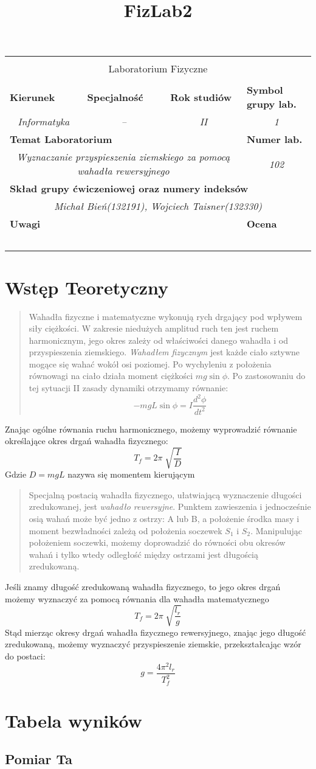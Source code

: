 \documentclass[polish,a4paper]{article}
\title{FizLab2}
\newcommand{\PRzFieldDsc}[1]{\sffamily\bfseries\scriptsize #1}
\newcommand{\PRzFieldCnt}[1]{\textit{#1}}
\newcommand{\PRzHeading}[8]{
\begin{center}
\begin{tabular}{ p{0.32\textwidth} p{0.15\textwidth} p{0.15\textwidth} p{0.12\textwidth} p{0.12\textwidth} }

  &   &   &   &   \\
\hline
\multicolumn{5}{|c|}{}\\[-1ex]
\multicolumn{5}{|c|}{{\LARGE #1}}\\
\multicolumn{5}{|c|}{}\\[-1ex]

\hline
\multicolumn{1}{|l|}{\PRzFieldDsc{Kierunek}}	& \multicolumn{1}{|l|}{\PRzFieldDsc{Specjalność}}	& \multicolumn{1}{|l|}{\PRzFieldDsc{Rok studiów}}	& \multicolumn{2}{|l|}{\PRzFieldDsc{Symbol grupy lab.}} \\
\multicolumn{1}{|c|}{\PRzFieldCnt{#2}}		& \multicolumn{1}{|c|}{\PRzFieldCnt{#3}}		& \multicolumn{1}{|c|}{\PRzFieldCnt{#4}}		& \multicolumn{2}{|c|}{\PRzFieldCnt{#5}} \\

\hline
\multicolumn{4}{|l|}{\PRzFieldDsc{Temat Laboratorium}}		& \multicolumn{1}{|l|}{\PRzFieldDsc{Numer lab.}} \\
\multicolumn{4}{|c|}{\PRzFieldCnt{#6}}				& \multicolumn{1}{|c|}{\PRzFieldCnt{#7}} \\

\hline
\multicolumn{5}{|l|}{\PRzFieldDsc{Skład grupy ćwiczeniowej oraz numery indeksów}}\\
\multicolumn{5}{|c|}{\PRzFieldCnt{#8}}\\

\hline
\multicolumn{3}{|l|}{\PRzFieldDsc{Uwagi}}	& \multicolumn{2}{|l|}{\PRzFieldDsc{Ocena}} \\
\multicolumn{3}{|c|}{\PRzFieldCnt{\ }}		& \multicolumn{2}{|c|}{\PRzFieldCnt{\ }} \\

\hline
\end{tabular}
\end{center}
}
\begin{document}
\PRzHeading{Laboratorium Fizyczne}{Informatyka}{--}{II}{1}{Wyznaczanie przyspieszenia ziemskiego
za pomocą wahadła rewersyjnego}{102}{Michał Bień(132191), Wojciech Taisner(132330)}{}

\section{Wstęp Teoretyczny}
\begin{quotation}\cite{szuba}
Wahadła fizyczne i matematyczne wykonują rych drgający pod wpływem siły ciężkości. W zakresie niedużych amplitud ruch ten jest ruchem harmonicznym, jego okres zależy od właściwości danego wahadła i od przyspieszenia ziemskiego.
\emph{Wahadłem fizycznym} jest każde ciało sztywne mogące się wahać wokół osi poziomej. Po wychyleniu z położenia równowagi na ciało działa moment ciężkości $mg\sin \phi$. Po zastosowaniu do tej sytuacji II zasady dynamiki otrzymamy równanie:
$$ -mgL\sin \phi = I \frac{d^2 \phi}{dt^2} $$
\end{quotation}
Znając ogólne równania ruchu harmonicznego, możemy wyprowadzić równanie określające okres drgań wahadła fizycznego:
$$ T_f = 2\pi \sqrt[]{\frac{I}{D}} $$
Gdzie $D=mgL$ nazywa się momentem kierującym

\begin{quotation}\cite{szuba}
Specjalną postacią wahadła fizycznego, ułatwiającą wyznaczenie długości zredukowanej, jest \emph{wahadło rewersyjne}. Punktem zawieszenia i jednocześnie osią wahań może być jedno z ostrzy: A lub B, a położenie środka masy i moment bezwładności zależą od położenia soczewek $S_1$ i $S_2$. Manipulując położeniem soczewki, możemy doprowadzić do równości obu okresów wahań i tylko wtedy odległość między ostrzami jest długością zredukowaną.
\end{quotation}
Jeśli znamy długość zredukowaną wahadła fizycznego, to jego okres drgań możemy wyznaczyć za pomocą równania dla wahadła matematycznego
$$T_f = 2\pi\sqrt[]{\frac{l_r}{g}}$$
Stąd mierząc okresy drgań wahadła fizycznego rewersyjnego, znając jego długość zredukowaną, możemy wyznaczyć przyspieszenie ziemskie, przekształcając wzór do postaci:
$$ g = \frac{4\pi^2l_r}{T_f^2} $$
\section{Tabela wyników}

\subsection{Pomiar Ta}
\end{document}
